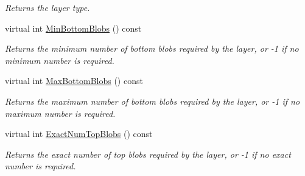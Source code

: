 \begin{DoxyCompactItemize}
\begin{DoxyCompactList}\small\item\em Returns the layer type. \end{DoxyCompactList}\item 
virtual int \hyperlink{classcaffe_1_1ScaleLayer_aa206c421231ff601970c881331ae7902}{Min\+Bottom\+Blobs} () const 
\begin{DoxyCompactList}\small\item\em Returns the minimum number of bottom blobs required by the layer, or -\/1 if no minimum number is required. \end{DoxyCompactList}\item 
virtual int \hyperlink{classcaffe_1_1ScaleLayer_ad4957839108b756f0327501641198a2d}{Max\+Bottom\+Blobs} () const 
\begin{DoxyCompactList}\small\item\em Returns the maximum number of bottom blobs required by the layer, or -\/1 if no maximum number is required. \end{DoxyCompactList}\item 
virtual int \hyperlink{classcaffe_1_1ScaleLayer_a41c1e942cff6005f71b882d0c5039cf0}{Exact\+Num\+Top\+Blobs} () const 
\begin{DoxyCompactList}\small\item\em Returns the exact number of top blobs required by the layer, or -\/1 if no exact number is required. \end{DoxyCompactList}\end{DoxyCompactItemize}
